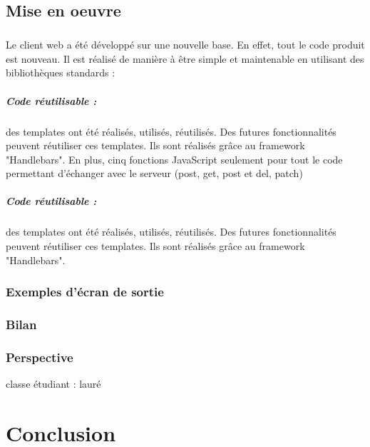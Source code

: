 \documentclass{report}
\begin{document}
\section{Mise en oeuvre}

\paragraph{}
Le client web a été développé sur une nouvelle base. En effet, tout le code produit est nouveau. Il est réalisé de manière
à être simple et maintenable en utilisant des bibliothèques standards :

\paragraph{Code réutilisable :} des templates ont été réalisés, utilisés, réutilisés. Des futures fonctionnalités 
peuvent réutiliser ces templates. Ils sont réalisés grâce au framework "Handlebars". En plus, cinq fonctions JavaScript
seulement pour tout le code permettant d'échanger avec le serveur (post, get, post et del, patch)

\paragraph{Code réutilisable :} des templates ont été réalisés, utilisés, réutilisés. Des futures fonctionnalités 
peuvent réutiliser ces templates. Ils sont réalisés grâce au framework "Handlebars".





\subsection{Exemples d'écran de sortie}
\subsection{Bilan}
\subsection{Perspective}
classe étudiant : lauré
\chapter*{Conclusion}

\paragraph{}
\end{document}
